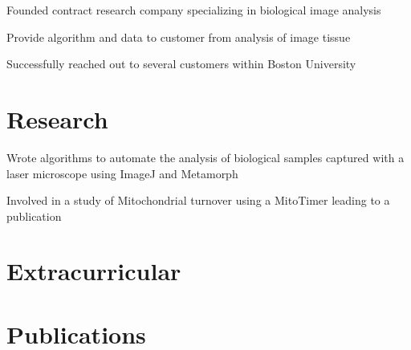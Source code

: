 \documentclass[]{deedy-resume}
\begin{document}
\begin{minipage}[t]{0.66\textwidth}
\begin{tightemize}
\item Founded contract research company specializing in biological image analysis
\item  Provide algorithm and data to customer from analysis of image tissue
\item Successfully reached out to several customers within Boston University
\end{tightemize}
\sectionsep



\section{Research}
\begin{tightemize}
\item Wrote algorithms to automate the analysis of biological samples captured with a laser microscope using ImageJ and Metamorph
\item Involved in a study of Mitochondrial turnover using a MitoTimer leading to a publication
\end{tightemize}
\sectionsep

\section{Extracurricular}
\sectionsep

\sectionsep


\section{Publications} 
\renewcommand\refname{\vskip -1.7cm} %


\nocite{*}

\end{minipage} 
\end{document}
